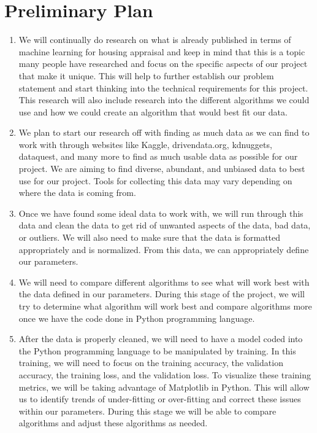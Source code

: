 \section{Preliminary Plan}

\begin{enumerate}
    \item We will continually do research on what is already published in terms of machine learning for housing appraisal and keep in mind that this is a topic many people have researched and focus on the specific aspects of our project that make it unique. This will help to further establish our problem statement and start thinking into the technical requirements for this project. This research will also include research into the different algorithms we could use and how we could create an algorithm that would best fit our data.
    
    \item We plan to start our research off with finding as much data as we can find to work with through websites like Kaggle, drivendata.org, kdnuggets, dataquest, and many more to find as much usable data as possible for our project. We are aiming to find diverse, abundant, and unbiased data to best use for our project. Tools for collecting this data may vary depending on where the data is coming from.
    
    \item Once we have found some ideal data to work with, we will run through this data and clean the data to get rid of unwanted aspects of the data, bad data, or outliers. We will also need to make sure that the data is formatted appropriately and is normalized. From this data, we can appropriately define our parameters.
    
    \item We will need to compare different algorithms to see what will work best with the data defined in our parameters. During this stage of the project, we will try to determine what algorithm will work best and compare algorithms more once we have the code done in Python programming language. 
    
    \item After the data is properly cleaned, we will need to have a model coded into the Python programming language to be manipulated by training. In this training, we will need to focus on the training accuracy, the validation accuracy, the training loss, and the validation loss. To visualize these training metrics, we will be taking advantage of Matplotlib in Python. This will allow us to identify trends of under-fitting or over-fitting and correct these issues within our parameters. During this stage we will be able to compare algorithms and adjust these algorithms as needed.  
    

\end{enumerate}
